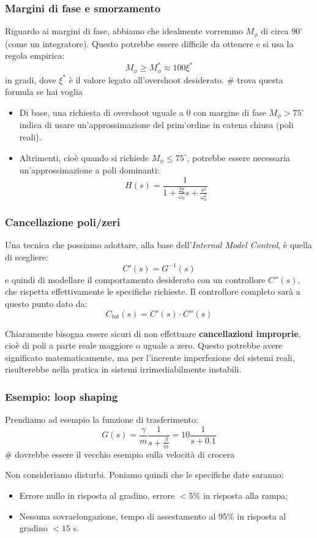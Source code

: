 \documentclass[a4paper,11pt]{article}
\begin{document}
\subsubsection{Margini di fase e smorzamento}
Riguardo ai margini di fase, abbiamo che idealmente vorremmo $M_\phi$ di circa $90^\circ$ (come un integratore).
Questo potrebbe essere difficile da ottenere e si usa la regola empirica:
$$
M_\phi \geq M_\phi^* \approx 100 \xi^*
$$
in gradi, dove $\xi^*$ è il valore legato all'overshoot desiderato. # trova questa formula se hai voglia

\begin{itemize}
	\item Di base, una richiesta di overshoot uguale a 0 con margine di fase $M_\phi > 75^\circ$ indica di usare un'approssimazione del prim'ordine in catena chiusa (poli reali).
	\item Altrimenti, cioè quando si richiede $M_\phi \leq 75^\circ$, potrebbe essere necessaria un'approssimazione a poli dominanti:
		$$
		H(s) = \frac{1}{1 + \frac{2\xi}{\omega_0} s + \frac{s^2}{\omega_0^2}}
		$$
\end{itemize}

\subsubsection{Cancellazione poli/zeri}
Una tecnica che possiamo adottare, alla base dell'\textit{Internal Model Control}, è quella di scegliere:
$$
C'(s) = G^{-1}(s)
$$
e quindi di modellare il comportamento desiderato con un controllore $C''(s)$, che rispetta effettivamente le specifiche richieste.
Il controllore completo sarà a questo punto dato da:
$$
C_{tot}(s) = C'(s) \cdot C''(s)
$$

Chiaramente bisogna essere sicuri di non effettuare \textbf{cancellazioni improprie}, cioè di poli a parte reale maggiore o uguale a zero.
Questo potrebbe avere significato matematicamente, ma per l'inerente imperfezione dei sistemi reali, risulterebbe nella pratica in sistemi irrimediabilmente instabili.

\subsubsection{Esempio: loop shaping}
Prendiamo ad esempio la funzione di trasferimento:
$$
G(s) = \frac{\gamma}{m} \frac{1}{s + \frac{\beta}{m}} = 10 \frac{1}{s + 0.1}
$$ # dovrebbe essere il vecchio esempio sulla velocità di crocera

Non consideriamo disturbi.
Poniamo quindi che le specifiche date saranno:
\begin{itemize}
	\item Errore nullo in risposta al gradino, errore $< 5\%$ in risposta alla rampa;
	\item Nessuna sovraelongazione, tempo di assestamento al 95\% in risposta al gradino $< 15$ s.
\end{itemize}
\end{document}
